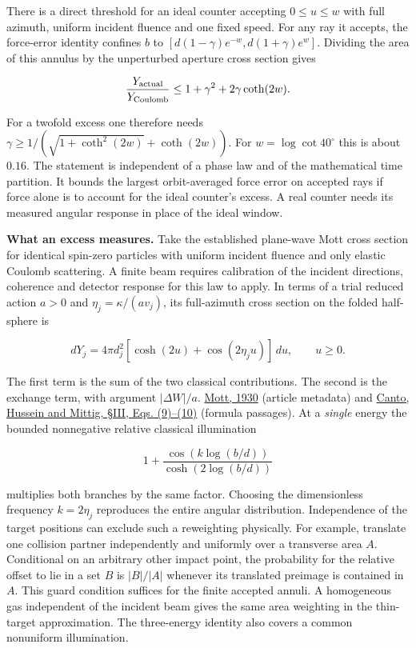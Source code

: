 \documentclass[11pt,a4paper]{article}
\begin{document}
There is a direct threshold for an ideal counter accepting
\(0\le u\le w\) with full azimuth, uniform incident fluence and one
fixed speed. For any ray it accepts, the force-error identity confines
\(b\) to \([d(1-\gamma)e^{-w},d(1+\gamma)e^w]\). Dividing the area of
this annulus by the unperturbed aperture cross section gives

\[
 \frac{Y_{\rm actual}}{Y_{\rm Coulomb}}
 \le 1+\gamma^2+2\gamma\coth(2w).
\]

For a twofold excess one therefore needs
\(\gamma\ge 1/(\sqrt{1+\coth^2(2w)}+\coth(2w))\). For
\(w=\log\cot40^\circ\) this is about \(0.16\). The statement is
independent of a phase law and of the mathematical time partition. It
bounds the largest orbit-averaged force error on accepted rays if force
alone is to account for the ideal counter's excess. A real counter needs
its measured angular response in place of the ideal window.

\textbf{What an excess measures.} Take the established plane-wave Mott
cross section for identical spin-zero particles with uniform incident
fluence and only elastic Coulomb scattering. A finite beam requires
calibration of the incident directions, coherence and detector response
for this law to apply. In terms of a trial reduced action \(a>0\) and
\(\eta_j=\kappa/(a v_j)\), its full-azimuth cross section on the folded
half-sphere is

\[
 dY_j=4\pi d_j^2
       [\cosh(2u)+\cos(2\eta_j u)]\,du,\qquad u\ge0 .
\]

The first term is the sum of the two classical contributions. The second
is the exchange term, with argument \(|\Delta W|/a\).
\href{https://doi.org/10.1098/rspa.1930.0006}{Mott, 1930} (article
metadata) and \href{https://arxiv.org/html/1402.1858\#S3}{Canto, Hussein
and Mittig, §III, Eqs. (9)--(10)} (formula passages). At a \emph{single}
energy the bounded nonnegative relative classical illumination

\[
 1+\frac{\cos(k\log(b/d))}{\cosh(2\log(b/d))}
\]

multiplies both branches by the same factor. Choosing the dimensionless
frequency \(k=2\eta_j\) reproduces the entire angular distribution.
Independence of the target positions can exclude such a reweighting
physically. For example, translate one collision partner independently
and uniformly over a transverse area \(A\). Conditional on an arbitrary
other impact point, the probability for the relative offset to lie in a
set \(B\) is \(|B|/|A|\) whenever its translated preimage is contained
in \(A\). This guard condition suffices for the finite accepted annuli.
A homogeneous gas independent of the incident beam gives the same area
weighting in the thin-target approximation. The three-energy identity
also covers a common nonuniform illumination.
\end{document}
